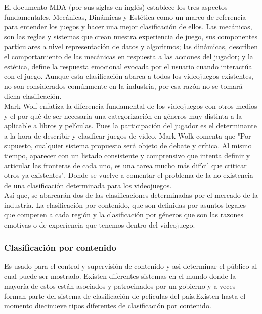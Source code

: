 El documento MDA\cite{vid10} (por sus siglas en inglés) establece los tres aspectos fundamentales, Mecánicas, Dinámicas y Estética como un marco de referencia para entender los juegos y hacer una mejor clasificación de ellos. Las mecánicas, son las reglas y sistemas que crean nuestra experiencia de juego, sus componentes particulares a nivel representación de datos y algoritmos; las dinámicas, describen el comportamiento de las mecánicas en respuesta a las acciones del jugador; y la estética, define la respuesta emocional evocada por el usuario cuando interactúa con el juego. Aunque esta clasificación abarca a todos los videojuegos existentes, no son considerados comúnmente en la industria, por esa razón no se tomará dicha clasificación.
\\[1pt]

Mark Wolf\cite{vid11} enfatiza la diferencia fundamental de los videojuegos con otros medios y el por qué de ser necesaria una categorización en géneros muy distinta a la aplicable a libros y películas. Pues la participación del jugador es el determinante a la hora de describir y clasificar juegos de video. Mark Wolk comenta que "Por supuesto, cualquier sistema propuesto será objeto de debate y crítica. Al mismo tiempo, aparecer con un listado consistente y comprensivo que intenta definir y articular las fronteras de cada uno, es una tarea mucho más difícil que criticar otros ya existentes". Donde se vuelve a comentar el problema de la no existencia de una clasificación determinada para los videojuegos.
\\[1pt]

Así que, se abarcarán dos de las clasificaciones determinadas por el mercado de la industria. La clasificación por contenido, que son definidas por asuntos legales que competen a cada región y la clasificación por géneros que son las razones emotivas o de experiencia que tenemos dentro del videojuego.
\\[1pt]

\subsubsection{Clasificación por contenido}

	Es usado para el control y supervisión de contenido y asi determinar el público al cual puede ser mostrado.  Existen diferentes sistemas en el mundo donde la mayoría de estos están asociados y patrocinados por un gobierno y a veces forman parte del sistema de clasificación de películas del país.Existen hasta el momento diecinueve tipos diferentes de clasificación por contenido.\\[1pt]	
	
